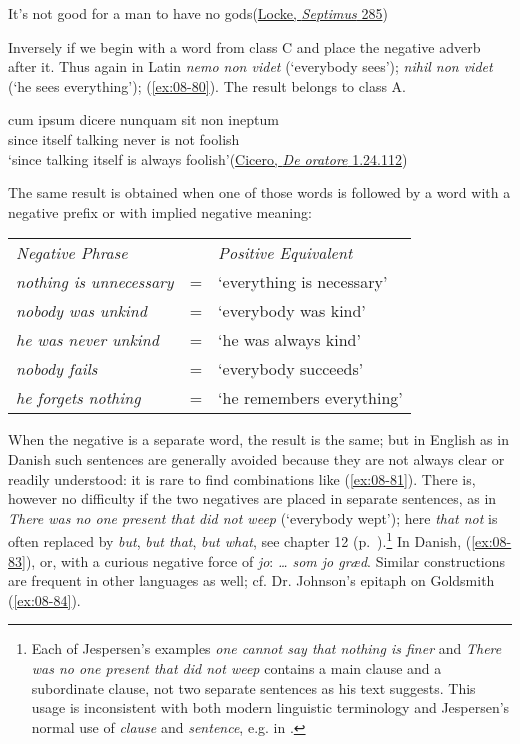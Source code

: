 \ea \label{ex:08-79}
It's not good for a man to have no gods\hfill(\href{https://archive.org/details/septimus00unkngoog/page/n267/mode/2up?q=%22not+good+for+a+man%22&view=theater}{Locke, \textit{Septimus} 285})
\z

\label{08-negativing-nobody}Inversely if we begin with a word from class C and place the negative adverb after it. Thus again in Latin \textit{nemo non videt} (`everybody sees'); \textit{nihil non videt} (`he sees everything'); (\ref{ex:08-80}). The result belongs to class A.

\ea \label{ex:08-80}
\gll cum ipsum dicere nunquam sit non ineptum\\ %
 since itself talking never is not foolish\\
\glt `since talking itself is always foolish'\hfill(\href{https://archive.org/details/deoratorelibri00cice/page/136/mode/2up?q=%22ipsum+dicere%22&view=theater}{Cicero, \textit{De oratore} 1.24.112}) 
\z


The same result is obtained when one of those words is followed by a word with a negative prefix or with implied negative meaning:

\bigskip

\begin{tabular}{@{}l c l@{}}
\emph{Negative Phrase} & & \emph{Positive Equivalent}\\
\textit{nothing is unnecessary} & = & `everything is necessary'\\
\textit{nobody was unkind} & = & `everybody was kind'\\
\textit{he was never unkind} & = & `he was always kind'\\
\textit{nobody fails} & = & `everybody succeeds'\\
\textit{he forgets nothing} & = & `he remembers everything'\\
\end{tabular}

\bigskip

When the negative is a separate word, the result is the same; but in English as in Danish such sentences are generally avoided because they are not always clear or readily understood: it is rare to find combinations like (\ref{ex:08-81}). There is, however no difficulty if the two negatives are placed in separate sentences, as in \textit{There was no one present that did not weep} (`everybody wept'); here \textit{that not} is often replaced by \textit{but}, \textit{but that}, \textit{but what}, see chapter 12 (p.~\pageref{ch:12}).\footnote{Each of Jespersen's examples \textit{one cannot say that nothing is finer} and \textit{There was no one present that did not weep} contains a main clause and a subordinate clause, not two separate sentences as his text suggests. This usage is inconsistent with both modern linguistic terminology and Jespersen's normal use of \textit{clause} and \textit{sentence}, e.g. in \citet[]{jespersenMEG2}. \eds} 
In Danish, (\ref{ex:08-83}), or, with a curious negative force of \textit{jo}: \textit{{\dots} som jo græd}. Similar constructions are frequent in other languages as well; cf. Dr. Johnson's epitaph on Goldsmith (\ref{ex:08-84}).

